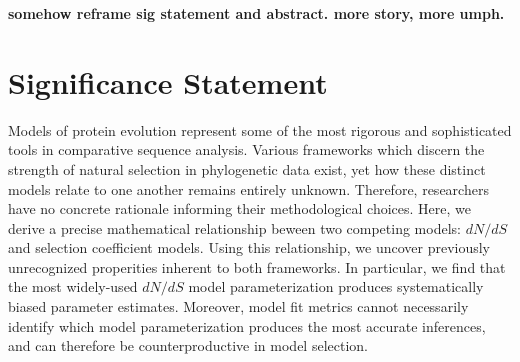 \documentclass[11pt]{article}
\begin{document}
	
	
%	
	



\textbf{somehow reframe sig statement and abstract. more story, more umph.}
		
\section*{Significance Statement} 
Models of protein evolution represent some of the most rigorous and sophisticated tools in comparative sequence analysis. Various frameworks which discern the strength of natural selection in phylogenetic data exist, yet how these distinct models relate to one another remains entirely unknown. Therefore, researchers have no concrete rationale informing their methodological choices. Here, we derive a precise mathematical relationship beween two competing models: $dN/dS$ and selection coefficient models. Using this relationship, we uncover previously unrecognized properities inherent to both frameworks. In particular, we find that the most widely-used $dN/dS$ model parameterization produces systematically biased parameter estimates. Moreover, model fit metrics cannot necessarily identify which model parameterization produces the most accurate inferences, and can therefore be counterproductive in model selection. %
\end{document}
